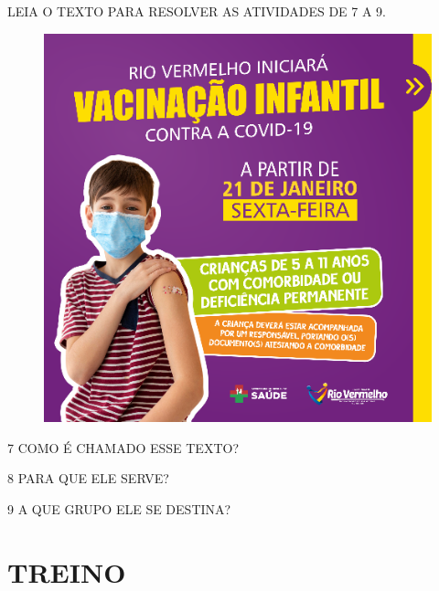 

LEIA O TEXTO PARA RESOLVER AS ATIVIDADES DE 7 A 9.

\begin{figure}[H]
\centering
\includegraphics[width=\textwidth]{media/image156.png}
\end{figure}


\num{7} COMO É CHAMADO ESSE TEXTO?


\num{8} PARA QUE ELE SERVE?


\num{9} A QUE GRUPO ELE SE DESTINA?


\section*{TREINO}


